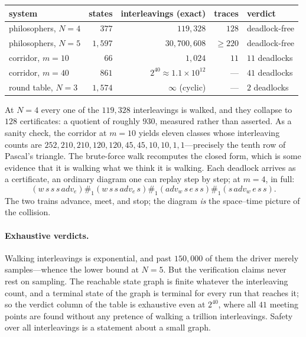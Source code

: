 \begin{center}
\begin{tabular}{l r r r l}
\toprule
system & states & interleavings (exact) & traces & verdict \\
\midrule
philosophers, $N=4$ & $377$ & $119{,}328$ & $128$ & deadlock-free \\
philosophers, $N=5$ & $1{,}597$ & $30{,}700{,}608$ & $\geq 220$ & deadlock-free \\
corridor, $m=10$ & $66$ & $1{,}024$ & $11$ & $11$ deadlocks \\
corridor, $m=40$ & $861$ & $2^{40} \approx 1.1 \times 10^{12}$ & --- & $41$ deadlocks \\
round table, $N=3$ & $1{,}574$ & $\infty$ (cyclic) & --- & $2$ deadlocks \\
\bottomrule
\end{tabular}
\end{center}

At $N=4$ every one of the $119{,}328$ interleavings is walked, and they
collapse to $128$ certificates: a quotient of roughly $930$, measured
rather than asserted. As a sanity check, the corridor at $m=10$ yields
eleven classes whose interleaving counts are $252, 210, 210, 120, 120, 45,
45, 10, 10, 1, 1$---precisely the tenth row of Pascal's triangle. The
brute-force walk recomputes the closed form, which is some evidence that
it is walking what we think it is walking. Each deadlock arrives as a
certificate, an ordinary diagram one can replay step by step; at $m=4$,
in full:
\[
  (w\, s\, s\, s\, \mathit{adv}_e)
  \mathbin{\#_1} (w\, s\, s\, \mathit{adv}_e\, s)
  \mathbin{\#_1} (\mathit{adv}_w\, s\, e\, s\, s)
  \mathbin{\#_1} (s\, \mathit{adv}_w\, e\, s\, s).
\]
The two trains advance, meet, and stop; the diagram \emph{is} the
space--time picture of the collision.

\paragraph{Exhaustive verdicts.}
Walking interleavings is exponential, and past $150{,}000$ of them the
driver merely samples---whence the lower bound at $N=5$. But the
verification claims never rest on sampling. The reachable state graph is
finite whatever the interleaving count, and a terminal state of the graph is
terminal for every run that reaches it; so the verdict column of the
table is exhaustive even at $2^{40}$, where all $41$ meeting points are
found without any pretence of walking a trillion interleavings. Safety over
all interleavings is a statement about a small graph.

